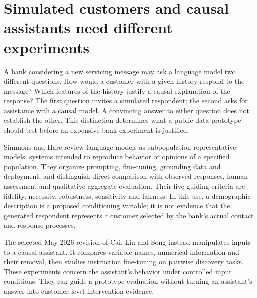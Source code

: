 \section{Simulated customers and causal assistants need different experiments}
\label{exec20:pa-scope}

A bank considering a new servicing message may ask a language model two
different questions. How would a customer with a given history respond to the
message? Which features of the history justify a causal explanation of the
response? The first question invites a simulated respondent; the second asks
for assistance with a causal model. A convincing answer to either question
does not establish the other. This distinction determines what a public-data
prototype should test before an expensive bank experiment is justified.

Simmons and Hare review language models as subpopulation representative
models: systems intended to reproduce behavior or opinions of a specified
population. They organize prompting, fine-tuning, grounding data and deployment,
and distinguish direct comparison with observed responses, human assessment
and qualitative aggregate evaluation. Their five guiding criteria are fidelity,
necessity, robustness, sensitivity and fairness. In this use, a demographic
description is a proposed conditioning variable; it is not evidence that the
generated respondent represents a customer selected by the bank's actual
contact and response processes.\citep{exec20_population}

The selected May 2026 revision of Cai, Liu and Song instead manipulates inputs
to a causal assistant. It compares variable names, numerical information and
their removal, then studies instruction fine-tuning on pairwise discovery
tasks. These experiments concern the assistant's behavior under controlled
input conditions. They can guide a prototype evaluation without turning an
assistant's answer into customer-level intervention evidence.
\citep{exec20_attribution}

